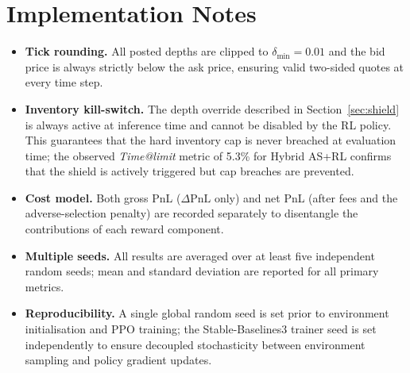 \documentclass[11pt]{article}
\newcommand{\PnL}{\mathrm{PnL}}
\begin{document}
\section{Implementation Notes}
\label{app:checklist}

\begin{itemize}[leftmargin=*, itemsep=2pt]
  \item \textbf{Tick rounding.}
    All posted depths are clipped to $\delta_{\min} = 0.01$ and the
    bid price is always strictly below the ask price, ensuring valid
    two-sided quotes at every time step.
  \item \textbf{Inventory kill-switch.}
    The depth override described in Section~\ref{sec:shield} is always
    active at inference time and cannot be disabled by the RL policy.
    This guarantees that the hard inventory cap is never breached at
    evaluation time; the observed \emph{Time@limit} metric of 5.3\% for
    Hybrid AS+RL confirms that the shield is actively triggered but cap
    breaches are prevented.
  \item \textbf{Cost model.}
    Both gross PnL ($\Delta\PnL$ only) and net PnL (after fees and the
    adverse-selection penalty) are recorded separately to disentangle
    the contributions of each reward component.
  \item \textbf{Multiple seeds.}
    All results are averaged over at least five independent random seeds;
    mean and standard deviation are reported for all primary metrics.
  \item \textbf{Reproducibility.}
    A single global random seed is set prior to environment initialisation
    and PPO training; the Stable-Baselines3 trainer seed is set
    independently to ensure decoupled stochasticity between environment
    sampling and policy gradient updates.
\end{itemize}

\printbibliography
\end{document}
